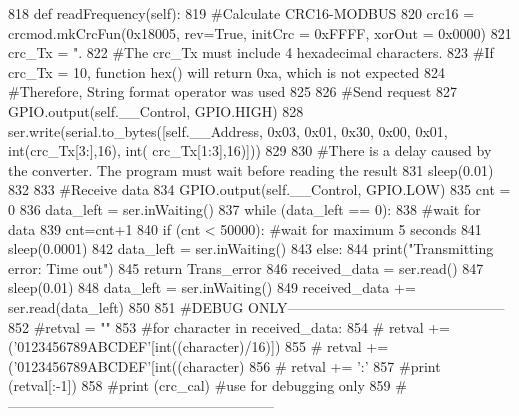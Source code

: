 \begin{DoxyCode}
818     \textcolor{keyword}{def }readFrequency(self):
819         \textcolor{comment}{#Calculate CRC16-MODBUS
}
820         crc16 = crcmod.mkCrcFun(0x18005, rev=\textcolor{keyword}{True}, initCrc = 0xFFFF, xorOut = 0x0000)
821         crc\_Tx = \textcolor{stringliteral}{".%
822         \textcolor{comment}{#The crc\_Tx must include 4 hexadecimal characters.
}
823         \textcolor{comment}{#If crc\_Tx =  10, function hex() will return 0xa, which is not expected
}
824         \textcolor{comment}{#Therefore, String format operator was used
}
825     
826         \textcolor{comment}{#Send request
}
827         GPIO.output(self.\_\_Control, GPIO.HIGH)
828         ser.write(serial.to\_bytes([self.\_\_Address, 0x03, 0x01, 0x30, 0x00, 0x01, int(crc\_Tx[3:],16), int(
      crc\_Tx[1:3],16)]))
829     
830         \textcolor{comment}{#There is a delay caused by the converter. The program must wait before reading the result
}
831         sleep(0.01)
832     
833         \textcolor{comment}{#Receive data
}
834         GPIO.output(self.\_\_Control, GPIO.LOW)
835         cnt = 0
836         data\_left = ser.inWaiting()
837         \textcolor{keywordflow}{while} (data\_left == 0):
838             \textcolor{comment}{#wait for data
}
839             cnt=cnt+1
840             \textcolor{keywordflow}{if} (cnt < 50000): \textcolor{comment}{#wait for maximum 5 seconds
}
841                 sleep(0.0001)
842                 data\_left = ser.inWaiting()
843             \textcolor{keywordflow}{else}:
844                 print(\textcolor{stringliteral}{"Transmitting error: Time out"})
845                 \textcolor{keywordflow}{return} Trans\_error
846         received\_data = ser.read()
847         sleep(0.01)
848         data\_left = ser.inWaiting()
849         received\_data += ser.read(data\_left)
850         
851         \textcolor{comment}{#DEBUG ONLY-----------------------------------------------
}
852         \textcolor{comment}{#retval = ""
}
853         \textcolor{comment}{#for character in received\_data:
}
854         \textcolor{comment}{#    retval += ('0123456789ABCDEF'[int((character)/16)])
}
855         \textcolor{comment}{#    retval += ('0123456789ABCDEF'[int((character)%
}
856         \textcolor{comment}{#    retval += ':'
}
857         \textcolor{comment}{#print (retval[:-1])
}
858         \textcolor{comment}{#print (crc\_cal) #use for debugging only
}
859         \textcolor{comment}{#---------------------------------------------------------
}}
\end{DoxyCode}
